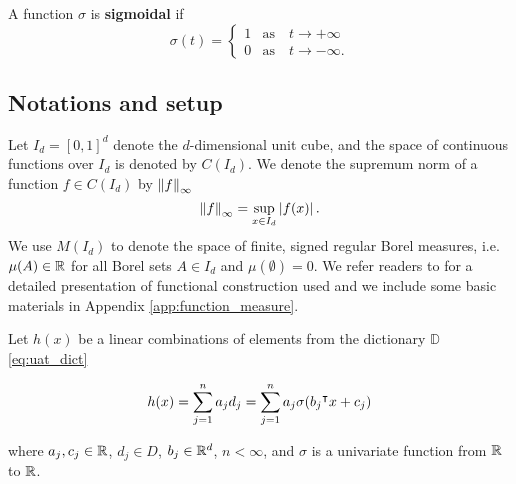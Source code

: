 

\begin{definition}\label{def:sigmoidal}
    A function $\sigma$ is \textbf{sigmoidal} if
    \begin{equation}
        \sigma(t) =
        \begin{cases}
            1 & \text{as} \quad t \to +\infty \\
            0 & \text{as} \quad t \to -\infty.
        \end{cases}
    \end{equation}
\end{definition}

\subsection*{Notations and setup}

Let $I_d = [0,1]^d$ denote the $d$-dimensional unit cube, and the space of
continuous functions over $I_d$ is denoted by $C(I_d)$. We denote the supremum
norm of a function $f \in C(I_d)$ by $\left\| f \right\|_{\infty}$ 
\begin{equation}
    \label{def:sup_norm}
    \left\| f \right\|_{\infty} = \sup_{x\in I_d} \left| f(x) \right|.
\end{equation}
We use $M(I_d)$ to denote the space of finite, signed regular Borel measures,
i.e. $\mu(A) \in \mathbb{R}$ for all Borel sets $A \in I_d$ and $\mu(\emptyset)= 0$. We
refer readers to \cite{rudinFunctionalAnalysis1991,
rudinRealComplexAnalysis1987} for a detailed presentation of functional
construction used and we include some basic materials in Appendix
\ref{app:function_measure}.

Let $h(x)$ be a linear combinations of elements from the dictionary $\mathbb{D}$
\eqref{eq:uat_dict}

\begin{equation}
    \label{eq:sum_sigma}
    h(x) = \sum_{j=1}^n a_j d_j = \sum_{j=1}^n a_j \sigma(b_j{}^{\intercal} x + c_j)
\end{equation}

where $a_j, c_j \in \mathbb{R}$, $d_j \in D$,  $b_j \in \mathbb{R}^d$, $n < \infty$, and
$\sigma$ is a univariate function from $\mathbb{R}$ to $\mathbb{R}$.
 
